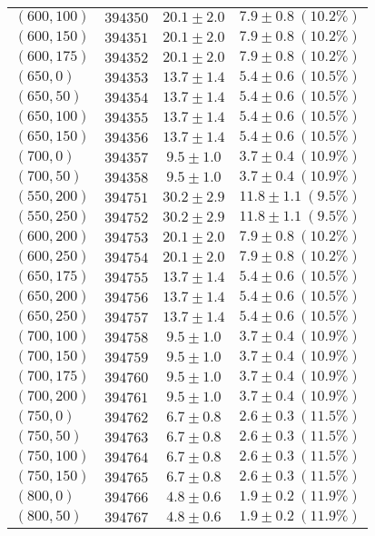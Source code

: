 \begin{table}[h]
\begin{center}
\begin{tabular}{|l|c|c|c|}
$(600,100)$ & $394350$ & $20.1\pm2.0$ & $7.9\pm0.8~(10.2\%)$ \\
$(600,150)$ & $394351$ & $20.1\pm2.0$ & $7.9\pm0.8~(10.2\%)$ \\
$(600,175)$ & $394352$ & $20.1\pm2.0$ & $7.9\pm0.8~(10.2\%)$ \\
$(650,0)$ & $394353$ & $13.7\pm1.4$ & $5.4\pm0.6~(10.5\%)$ \\
$(650,50)$ & $394354$ & $13.7\pm1.4$ & $5.4\pm0.6~(10.5\%)$ \\
$(650,100)$ & $394355$ & $13.7\pm1.4$ & $5.4\pm0.6~(10.5\%)$ \\
$(650,150)$ & $394356$ & $13.7\pm1.4$ & $5.4\pm0.6~(10.5\%)$ \\
$(700,0)$ & $394357$ & $9.5\pm1.0$ & $3.7\pm0.4~(10.9\%)$ \\
$(700,50)$ & $394358$ & $9.5\pm1.0$ & $3.7\pm0.4~(10.9\%)$ \\
$(550,200)$ & $394751$ & $30.2\pm2.9$ & $11.8\pm1.1~(9.5\%)$ \\
$(550,250)$ & $394752$ & $30.2\pm2.9$ & $11.8\pm1.1~(9.5\%)$ \\
$(600,200)$ & $394753$ & $20.1\pm2.0$ & $7.9\pm0.8~(10.2\%)$ \\
$(600,250)$ & $394754$ & $20.1\pm2.0$ & $7.9\pm0.8~(10.2\%)$ \\
$(650,175)$ & $394755$ & $13.7\pm1.4$ & $5.4\pm0.6~(10.5\%)$ \\
$(650,200)$ & $394756$ & $13.7\pm1.4$ & $5.4\pm0.6~(10.5\%)$ \\
$(650,250)$ & $394757$ & $13.7\pm1.4$ & $5.4\pm0.6~(10.5\%)$ \\
$(700,100)$ & $394758$ & $9.5\pm1.0$ & $3.7\pm0.4~(10.9\%)$ \\
$(700,150)$ & $394759$ & $9.5\pm1.0$ & $3.7\pm0.4~(10.9\%)$ \\
$(700,175)$ & $394760$ & $9.5\pm1.0$ & $3.7\pm0.4~(10.9\%)$ \\
$(700,200)$ & $394761$ & $9.5\pm1.0$ & $3.7\pm0.4~(10.9\%)$ \\
$(750,0)$ & $394762$ & $6.7\pm0.8$ & $2.6\pm0.3~(11.5\%)$ \\
$(750,50)$ & $394763$ & $6.7\pm0.8$ & $2.6\pm0.3~(11.5\%)$ \\
$(750,100)$ & $394764$ & $6.7\pm0.8$ & $2.6\pm0.3~(11.5\%)$ \\
$(750,150)$ & $394765$ & $6.7\pm0.8$ & $2.6\pm0.3~(11.5\%)$ \\
$(800,0)$ & $394766$ & $4.8\pm0.6$ & $1.9\pm0.2~(11.9\%)$ \\
$(800,50)$ & $394767$ & $4.8\pm0.6$ & $1.9\pm0.2~(11.9\%)$ \\

\end{tabular}
\end{center}
\end{table}
